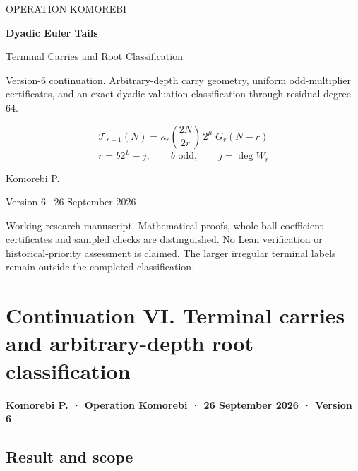 \documentclass[11pt,letterpaper]{article}
\begin{document}
\hypersetup{pageanchor=false}
\begin{titlepage}
\thispagestyle{empty}
\vspace*{0.65in}
{\sffamily\large OPERATION KOMOREBI\par}
\vspace{0.55in}
{\sffamily\fontsize{31}{36}\selectfont\bfseries Dyadic Euler Tails\par}
\vspace{0.20in}
{\sffamily\fontsize{20}{25}\selectfont Terminal Carries and Root Classification\par}
\vspace{0.38in}
{\large Version-6 continuation. Arbitrary-depth carry geometry, uniform odd-multiplier certificates, and an exact dyadic valuation classification through residual degree 64.\par}
\vspace{0.45in}
\[
\mathcal T_{r-1}(N)=\kappa_r\binom{2N}{2r}\,2^{\mu_r}G_r(N-r)
\]
\[
r=b2^L-j,\qquad b\text{ odd},\qquad j=\deg W_r
\]
\vfill
{\large Komorebi P.\par}
\vspace{0.14in}
{\sffamily Version 6 \textbar\ 26 September 2026\par}
\vspace{0.35in}
\begin{minipage}{0.94\textwidth}
\small
Working research manuscript. Mathematical proofs, whole-ball coefficient certificates and sampled checks are distinguished. No Lean verification or historical-priority assessment is claimed. The larger irregular terminal labels remain outside the completed classification.
\end{minipage}
\end{titlepage}
\hypersetup{pageanchor=true}
\setcounter{tocdepth}{2}
\tableofcontents
\clearpage
{}
\section{Continuation VI. Terminal carries and arbitrary-depth root classification}\label{continuation-vi.-terminal-carries-and-arbitrary-depth-root-classification}

\textbf{Komorebi P. · Operation Komorebi · 26 September 2026 · Version 6}

\subsection{Result and scope}\label{result-and-scope}
\end{document}
